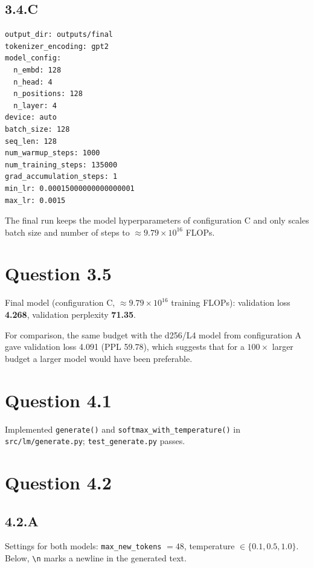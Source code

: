 \documentclass{article}
\begin{document}
\subsection*{3.4.C}
\begin{lstlisting}
output_dir: outputs/final
tokenizer_encoding: gpt2
model_config:
  n_embd: 128
  n_head: 4
  n_positions: 128
  n_layer: 4
device: auto
batch_size: 128
seq_len: 128
num_warmup_steps: 1000
num_training_steps: 135000
grad_accumulation_steps: 1
min_lr: 0.00015000000000000001
max_lr: 0.0015
\end{lstlisting}
The final run keeps the model hyperparameters of configuration C and only scales batch size and number of steps to $\approx 9.79\times10^{16}$ FLOPs.

\section*{Question 3.5}
Final model (configuration C, $\approx 9.79\times10^{16}$ training FLOPs): validation loss \textbf{4.268}, validation perplexity \textbf{71.35}.

For comparison, the same budget with the d256/L4 model from configuration A gave validation loss 4.091 (PPL 59.78), which suggests that for a $100\times$ larger budget a larger model would have been preferable.

\section*{Question 4.1}
Implemented \texttt{generate()} and \texttt{softmax\_with\_temperature()} in \texttt{src/lm/generate.py}; \texttt{test\_generate.py} passes.

\section*{Question 4.2}

\subsection*{4.2.A}
Settings for both models: \texttt{max\_new\_tokens} $= 48$, temperature $\in \{0.1, 0.5, 1.0\}$. Below, \texttt{\textbackslash n} marks a newline in the generated text.
\end{document}
